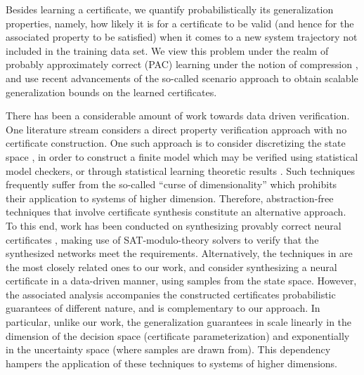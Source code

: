 Besides learning a certificate, we quantify probabilistically its generalization properties, namely, how likely it is for a certificate to be valid (and hence for the associated property
to be satisfied) when it comes to a new system trajectory not included in the training data set. We view this problem under
the realm of probably approximately correct (PAC) learning under the notion of compression \cite{DBLP:journals/jmlr/CampiG23,Floyd_Warmuth_1995,DBLP:journals/tac/MargellosPL15}, and use recent advancements
of the so-called scenario approach \cite{Scen_approach_book,DBLP:journals/siamjo/CampiG08,DBLP:journals/mp/CampiG18,DBLP:journals/tac/CampiGR18,DBLP:journals/mp/GarattiC22} to obtain scalable generalization bounds on the learned certificates.

There has been a considerable amount of work towards data driven verification. One literature stream considers a direct property verification approach with no certificate construction. 
One such approach is to consider discretizing the state space \cite{DBLP:journals/jair/BadingsRAPPSJ23,DBLP:conf/qest/RickardBRA23}, in order to construct a finite model which may be verified using statistical model checkers, or through statistical learning theoretic results \cite{DBLP:journals/sttt/BadingsCJJKT22,DBLP:conf/l4dc/RickardAM24}.
Such techniques frequently suffer from the so-called ``curse of dimensionality'' which prohibits their application to systems of higher dimension.
Therefore, abstraction-free techniques that involve certificate synthesis constitute an alternative approach.
To this end, work has been conducted on synthesizing provably correct neural certificates \cite{DBLP:conf/hybrid/AbateAEGP21,DBLP:conf/hybrid/EdwardsPA24}, making use of SAT-modulo-theory solvers to verify that the synthesized networks meet the requirements.
Alternatively, the techniques in \cite{DBLP:journals/tac/NejatiLJSZ23,DBLP:journals/automatica/SalamatiLSZ24} are the most closely related ones to our work, and consider synthesizing a neural certificate in a data-driven manner, using samples from the state space. However, the associated analysis accompanies the constructed certificates probabilistic guarantees of different nature, and is complementary to our approach. In particular, unlike our work, the generalization guarantees in \cite{DBLP:journals/tac/NejatiLJSZ23} scale linearly in the dimension of the decision space (certificate parameterization) and exponentially in the uncertainty space (where samples are drawn from). This dependency hampers the application of these techniques to systems of higher dimensions.


